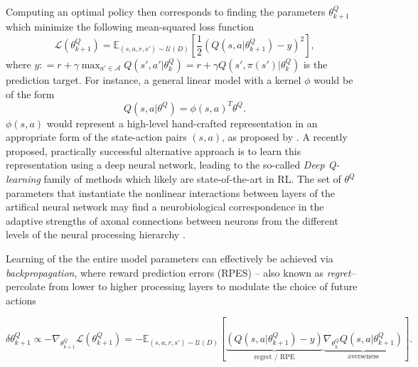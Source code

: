 \documentclass[10pt,letterpaper]{article}
\begin{document}
Computing an optimal policy then corresponds to finding the parameters $\theta^Q_{k+1}$ which minimize the following mean-squared loss function
\begin{equation}
  \mathcal L(\theta^Q_{k+1})
  = \mathbb E_{(s, a, r, s') \sim \mathcal U(D)}\left[\frac{1}{2}(Q(s, a|\theta^Q_{k+1}) - y)^2\right],
  \label{eq:oracle}
\end{equation}
where
$ y: = r + \gamma \max_{a' \in \mathcal A} Q(s', a'|\theta^Q_k) = r + \gamma Q(s', \pi(s')|\theta^Q_k)$ is the prediction target.
For instance, a general linear model with a kernel $\phi$ would be of the
form
$${Q}(s, a|\theta^Q) = \phi(s,a)^T\theta^Q.$$
$\phi(s,a)$ would represent a high-level hand-crafted representation in an
appropriate form of the state-action pairs $(s,a)$,
as proposed by \citep{songNIPS2016}.
A recently proposed, practically successful alternative approach
\citep{mnih2015,silver2016mastering} is to learn this
representation using a deep neural network, leading to the so-called \textit{Deep Q-learning} family of methods which
likely are state-of-the-art in RL.
The set of $\theta^Q$ parameters that instantiate the nonlinear interactions
between layers of the artifical neural network
may find a neurobiological correspondence in the adaptive strengths of axonal
connections between neurons from the different levels
of the neural processing hierarchy
\citep{mesulam1998sensation, taylor2015global}.



Learning
of the the entire model parameters can effectively be achieved
via \textit{backpropagation},
where reward prediction errors (RPES) -- also known as \textit{regret}-- percolate from lower to higher processing layers to modulate the choice of future actions

\begin{equation}
  \delta \theta_{k+1}^Q \propto -\nabla_{\theta^Q_{k+1}}\mathcal L(\theta^Q_{k+1})
  = -\mathbb E_{(s, a, r, s') \sim \mathcal U(D)}\left[\underbrace{(Q(s, a|\theta^Q_{k+1}) - y)}_{\text{regret / RPE}}
    \underbrace{\nabla_{\theta^Q_{k}}Q(s, a|\theta^Q_{k+1})}_{\text{averseness}}\right].
  \label{eq:oracle}
\end{equation}
\end{document}
